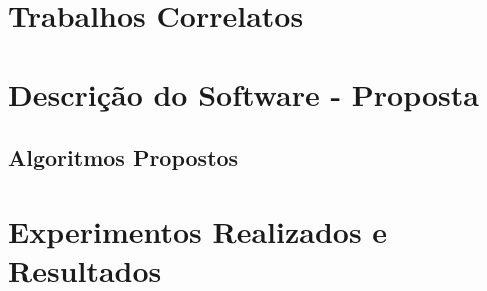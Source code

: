 \documentclass[rascunho]{fei}
\begin{document}
\chapter{Trabalhos Correlatos}
\label{chap:relatedwork}



\chapter{Descrição do Software - Proposta}
\label{chap:software}


\section{Algoritmos Propostos}




\chapter{Experimentos Realizados e Resultados}
\label{chap:experiments}




\end{document}
